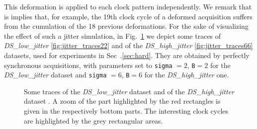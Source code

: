 This deformation is applied to each clock pattern independently. We remark that is implies that, for example, the 19th clock cycle of a deformed acquisition suffers from the cumulation of the 18 previous deformations. For the sake of visualizing the effect of such a jitter simulation, in Fig.~\ref{fig:jitter_traces} we depict some traces of  \emph{DS\_low\_jitter} \ref{fig:jitter_traces22} and of the \emph{DS\_high\_jitter} \ref{fig:jitter_traces66} datasets, used for experiments in Sec~.\ref{sec:hard}. They are obtained by perfectly synchronous acquisitions, with parameters set to \texttt{sigma} $= 2$, \texttt{B}$= 2$ for the \emph{DS\_low\_jitter}  dataset and \texttt{sigma} $= 6$, \texttt{B}$= 6$ for the \emph{DS\_high\_jitter} one.


\begin{figure}
\centering
{}
\caption[Hardware misalignment: \emph{DS\_low\_jitter} and \emph{DS\_high\_jitter} datasets.]{Some traces of the \emph{DS\_low\_jitter} dataset   and of the \emph{DS\_high\_jitter} dataset . A zoom of the part highlighted by the red rectangles is given in the respectively bottom parts. The interesting clock cycles are highlighted by the grey rectangular areas.}\label{fig:jitter_traces}
\end{figure}

